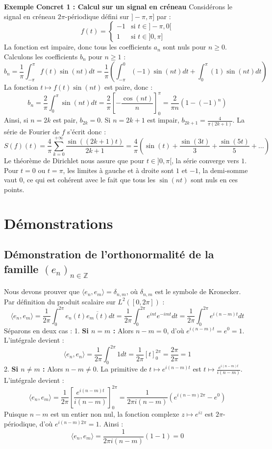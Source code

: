 \documentclass[12pt,a4paper]{article}
\begin{document}
\textbf{Exemple Concret 1 : Calcul sur un signal en créneau}
Considérons le signal en créneau $2\pi$-périodique défini sur $]-\pi, \pi]$ par :
$$f(t) = \begin{cases} -1 & \text{si } t \in ]-\pi, 0[ \\ 1 & \text{si } t \in ]0, \pi] \end{cases}$$
La fonction est impaire, donc tous les coefficients $a_n$ sont nuls pour $n \ge 0$.
Calculons les coefficients $b_n$ pour $n \ge 1$ :
$$b_n = \frac{1}{\pi} \int_{-\pi}^{\pi} f(t) \sin(nt) dt = \frac{1}{\pi} \left( \int_{-\pi}^{0} (-1) \sin(nt) dt + \int_{0}^{\pi} (1) \sin(nt) dt \right)$$
La fonction $t \mapsto f(t)\sin(nt)$ est paire, donc :
$$b_n = \frac{2}{\pi} \int_{0}^{\pi} \sin(nt) dt = \frac{2}{\pi} \left[ -\frac{\cos(nt)}{n} \right]_0^\pi = \frac{2}{\pi n} \left( 1 - (-1)^n \right)$$
Ainsi, si $n = 2k$ est pair, $b_{2k} = 0$.
Si $n = 2k+1$ est impair, $b_{2k+1} = \frac{4}{\pi (2k+1)}$.
La série de Fourier de $f$ s'écrit donc :
$$S(f)(t) = \frac{4}{\pi} \sum_{k=0}^{+\infty} \frac{\sin((2k+1)t)}{2k+1} = \frac{4}{\pi} \left( \sin(t) + \frac{\sin(3t)}{3} + \frac{\sin(5t)}{5} + \dots \right)$$
Le théorème de Dirichlet nous assure que pour $t \in ]0, \pi[$, la série converge vers $1$.
Pour $t = 0$ ou $t = \pi$, les limites à gauche et à droite sont $1$ et $-1$, la demi-somme vaut $0$, ce qui est cohérent avec le fait que tous les $\sin(nt)$ sont nuls en ces points.

\section{Démonstrations}

\subsection{Démonstration de l'orthonormalité de la famille $(e_n)_{n \in \mathbb{Z}}$}

Nous devons prouver que $\langle e_n, e_m \rangle = \delta_{n,m}$, où $\delta_{n,m}$ est le symbole de Kronecker.
Par définition du produit scalaire sur $L^2([0, 2\pi])$ :
$$\langle e_n, e_m \rangle = \frac{1}{2\pi} \int_0^{2\pi} e_n(t) \overline{e_m(t)} dt = \frac{1}{2\pi} \int_0^{2\pi} e^{int} e^{-imt} dt = \frac{1}{2\pi} \int_0^{2\pi} e^{i(n-m)t} dt$$
Séparons en deux cas :
1. \textbf{Si $n = m$ :}
   Alors $n-m = 0$, d'où $e^{i(n-m)t} = e^0 = 1$.
   L'intégrale devient :
   $$\langle e_n, e_n \rangle = \frac{1}{2\pi} \int_0^{2\pi} 1 dt = \frac{1}{2\pi} \left[ t \right]_0^{2\pi} = \frac{2\pi}{2\pi} = 1$$
2. \textbf{Si $n \neq m$ :}
   Alors $n-m \neq 0$. La primitive de $t \mapsto e^{i(n-m)t}$ est $t \mapsto \frac{e^{i(n-m)t}}{i(n-m)}$.
   L'intégrale devient :
   $$\langle e_n, e_m \rangle = \frac{1}{2\pi} \left[ \frac{e^{i(n-m)t}}{i(n-m)} \right]_0^{2\pi} = \frac{1}{2\pi i (n-m)} \left( e^{i(n-m)2\pi} - e^0 \right)$$
   Puisque $n-m$ est un entier non nul, la fonction complexe $z \mapsto e^{iz}$ est $2\pi$-périodique, d'où $e^{i(n-m)2\pi} = 1$.
   Ainsi :
   $$\langle e_n, e_m \rangle = \frac{1}{2\pi i (n-m)} (1 - 1) = 0$$
\end{document}

